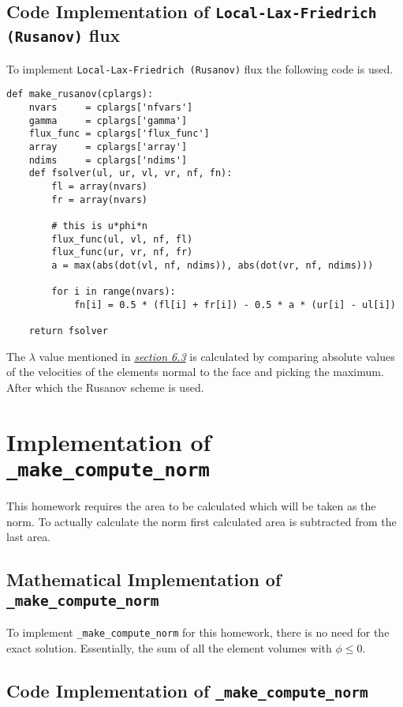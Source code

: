 \documentclass[a4paper, 12pt]{article}
\begin{document}
\subsection{Code Implementation of \texttt{Local-Lax-Friedrich (Rusanov)} flux}
To implement \verb|Local-Lax-Friedrich (Rusanov)| flux the following code is used. 
\begin{verbatim}
def make_rusanov(cplargs):
    nvars     = cplargs['nfvars']
    gamma     = cplargs['gamma']
    flux_func = cplargs['flux_func']
    array     = cplargs['array']
    ndims     = cplargs['ndims']
    def fsolver(ul, ur, vl, vr, nf, fn):
        fl = array(nvars)
        fr = array(nvars)

        # this is u*phi*n 
        flux_func(ul, vl, nf, fl)
        flux_func(ur, vr, nf, fr)
        a = max(abs(dot(vl, nf, ndims)), abs(dot(vr, nf, ndims)))

        for i in range(nvars):
            fn[i] = 0.5 * (fl[i] + fr[i]) - 0.5 * a * (ur[i] - ul[i])

    return fsolver
\end{verbatim}

The $\lambda$ value mentioned in \hyperref[sec:rusanov]{\textit{section 6.3}} is calculated by comparing absolute values of the velocities of the elements normal to the face and picking the maximum. After which the Rusanov scheme is used.

\section{Implementation of \texttt{\_make\_compute\_norm}}

This homework requires the area to be calculated which will be taken as the norm. To actually calculate the norm first calculated area is subtracted from the last area.

\subsection{Mathematical Implementation of \texttt{\_make\_compute\_norm}}

To implement \verb|_make_compute_norm| for this homework, there is no need for the exact solution. Essentially, the sum of all the element volumes with $\phi \leq 0$.

\subsection{Code Implementation of \texttt{\_make\_compute\_norm}}
\end{document}
